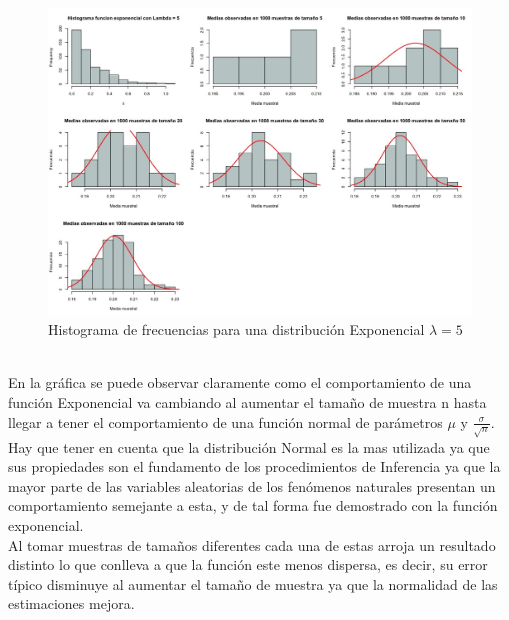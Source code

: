 \documentclass[letterpaper,12pt,onecolumn,titlepage]{article}
\begin{document}
\begin{figure}[!h]
    \begin{center}
        \includegraphics[width=15cm]{figuras/4.jpeg}
        \caption{Histograma de frecuencias para una distribuci\'{o}n Exponencial $\lambda=5$}
        \label{fig:Densidad}
    \end{center}
\end{figure}

~\\En la gr\'{a}fica se puede observar claramente como el comportamiento de una funci\'{o}n Exponencial va cambiando al aumentar el tama\~{n}o de muestra n hasta llegar a tener el comportamiento de una funci\'{o}n normal de par\'{a}metros $\mu$ y $\frac{\sigma}{\sqrt{n}}$. 
~\\Hay que tener en cuenta que la distribuci\'{o}n Normal es la mas utilizada ya que sus propiedades
son el fundamento de los procedimientos de Inferencia ya que la mayor parte
de las variables aleatorias de los fen\'{o}menos naturales presentan un comportamiento semejante a esta, y de tal forma fue demostrado con la funci\'{o}n exponencial.
~\\Al tomar muestras de tama\~{n}os diferentes cada una de estas arroja un resultado distinto lo que conlleva a que la funci\'{o}n este menos dispersa, es decir, su error t\'{i}pico disminuye al aumentar el tama\~{n}o de muestra ya que la normalidad de las estimaciones mejora.
\end{document}
